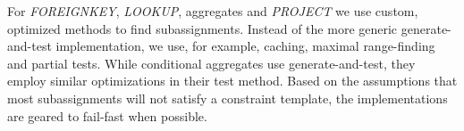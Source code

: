 For \textit{FOREIGNKEY}, \textit{LOOKUP}, aggregates and \textit{PROJECT} we use custom, optimized methods to find subassignments.
Instead of the more generic generate-and-test implementation, we use, for example, caching, maximal range-finding and partial tests.
While conditional aggregates use generate-and-test, they employ similar optimizations in their test method.
Based on the assumptions that most subassignments will not satisfy a constraint template, the implementations are geared to fail-fast when possible.










